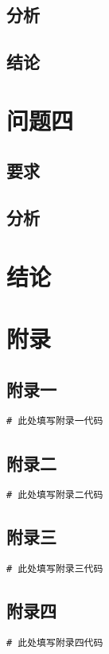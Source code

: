 \documentclass{ctexart}
\begin{document}
\subsection{分析}
\subsection{结论}

\section{问题四}
\subsection{要求}
\subsection{分析}

\section{结论}

\newpage
\section{附录}
\subsection{附录一}
\begin{verbatim}
# 此处填写附录一代码
\end{verbatim}

\subsection{附录二}
\begin{verbatim}
# 此处填写附录二代码
\end{verbatim}

\subsection{附录三}
\begin{verbatim}
# 此处填写附录三代码
\end{verbatim}

\subsection{附录四}
\begin{verbatim}
# 此处填写附录四代码
\end{verbatim}
\end{document}

